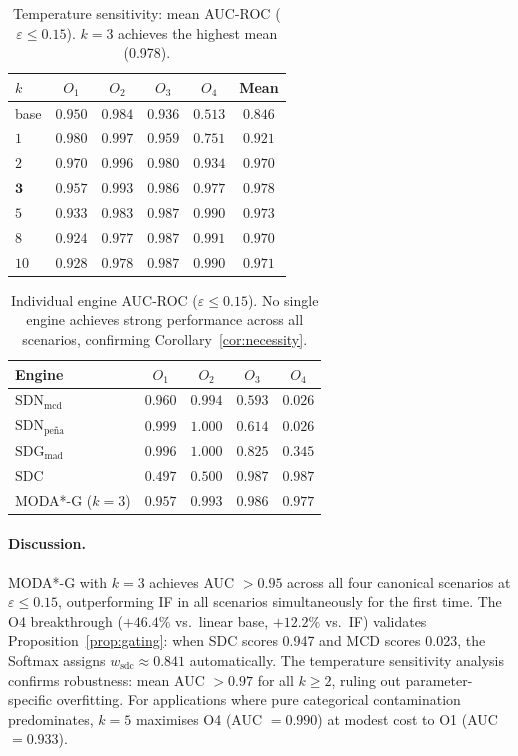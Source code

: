 \documentclass[11pt]{article}
\theoremstyle{plain}
\theoremstyle{definition}
\begin{document}
\begin{table}[ht]
\centering
\caption{Temperature sensitivity: mean AUC-ROC
  ($\varepsilon \leq 0.15$). $k=3$ achieves the
  highest mean (0.978).}
\label{tab:sensitivity}
\small
\begin{tabular}{lccccc}
\toprule
$k$ & $O_1$ & $O_2$ & $O_3$ & $O_4$ & Mean \\
\midrule
base & $0.950$ & $0.984$ & $0.936$ & $0.513$ & $0.846$\\
$1$  & $0.980$ & $0.997$ & $0.959$ & $0.751$ & $0.921$\\
$2$  & $0.970$ & $0.996$ & $0.980$ & $0.934$ & $0.970$\\
$\mathbf{3}$
     & $\mathbf{0.957}$ & $\mathbf{0.993}$
     & $\mathbf{0.986}$ & $\mathbf{0.977}$
     & $\mathbf{0.978}$\\
$5$  & $0.933$ & $0.983$ & $0.987$ & $0.990$ & $0.973$\\
$8$  & $0.924$ & $0.977$ & $0.987$ & $0.991$ & $0.970$\\
$10$ & $0.928$ & $0.978$ & $0.987$ & $0.990$ & $0.971$\\
\bottomrule
\end{tabular}
\end{table}

\begin{table}[ht]
\centering
\caption{Individual engine AUC-ROC
  ($\varepsilon \leq 0.15$). No single engine achieves
  strong performance across all scenarios, confirming
  Corollary~\ref{cor:necessity}.}
\label{tab:engines}
\small
\begin{tabular}{lcccc}
\toprule
Engine & $O_1$ & $O_2$ & $O_3$ & $O_4$ \\
\midrule
$\text{SDN}_\text{mcd}$   & $0.960$
  & $0.994$ & $0.593$ & $0.026$ \\
$\text{SDN}_\text{pe\~{n}a}$ & $0.999$
  & $1.000$ & $0.614$ & $0.026$ \\
$\text{SDG}_\text{mad}$   & $0.996$
  & $1.000$ & $0.825$ & $0.345$ \\
$\text{SDC}$               & $0.497$
  & $0.500$ & $0.987$ & $0.987$ \\
\midrule
MODA*-G ($k=3$) & $\mathbf{0.957}$
  & $\mathbf{0.993}$ & $\mathbf{0.986}$
  & $\mathbf{0.977}$ \\
\bottomrule
\end{tabular}
\end{table}

\paragraph{Discussion.}
MODA*-G with $k=3$ achieves AUC $> 0.95$ across all
four canonical scenarios at $\varepsilon \leq 0.15$,
outperforming IF in all scenarios simultaneously for
the first time. The O4 breakthrough ($+46.4\%$ vs.\
linear base, $+12.2\%$ vs.\ IF) validates
Proposition~\ref{prop:gating}: when SDC scores 0.947
and MCD scores 0.023, the Softmax assigns
$w_\text{sdc} \approx 0.841$ automatically. The
temperature sensitivity analysis confirms robustness:
mean AUC $> 0.97$ for all $k \geq 2$, ruling out
parameter-specific overfitting. For applications where
pure categorical contamination predominates, $k=5$
maximises O4 (AUC $= 0.990$) at modest cost to O1
(AUC $= 0.933$).
\end{document}
